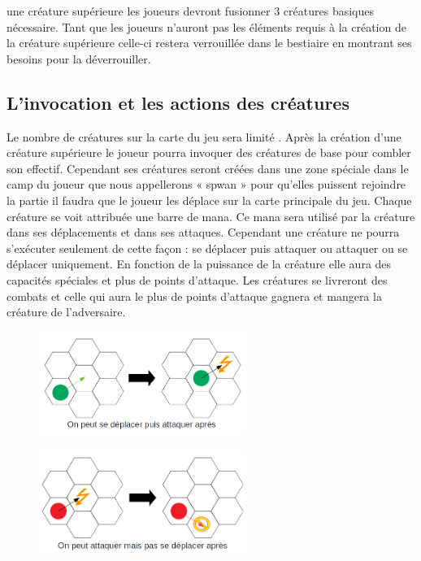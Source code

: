 \documentclass[12pt]{extarticle}
\begin{document}
une créature supérieure les joueurs devront fusionner 3 créatures basiques nécessaire. Tant que les joueurs n’auront pas les éléments requis à la création de la créature supérieure celle-ci restera verrouillée dans le bestiaire en montrant ses besoins pour la déverrouiller. 

\subsection{L'invocation et les actions des créatures}

Le nombre de créatures sur la carte du jeu sera limité . Après la création d’une créature supérieure le joueur pourra invoquer des créatures de base pour combler son effectif. Cependant ses créatures seront créées dans une zone spéciale dans le camp du joueur que nous appellerons « spwan » pour qu’elles puissent rejoindre la partie il faudra que le joueur les déplace sur la carte principale du jeu. Chaque créature se voit attribuée une barre de mana. Ce mana sera utilisé par la créature dans ses déplacements et dans ses attaques. Cependant une créature ne pourra s’exécuter seulement de cette façon : se déplacer puis attaquer ou attaquer ou se déplacer uniquement. En fonction de la puissance de la créature elle aura des capacités spéciales et plus de points d’attaque. Les créatures se livreront des combats et celle qui aura le plus de points d’attaque gagnera et mangera la créature de l’adversaire.

\begin{figure}[!h]
	\center
	\includegraphics[width=0.6\textwidth]{deplaatta}
\end{figure}

\begin{figure}[!h]
	\center
	\includegraphics[width=0.6\textwidth]{attadepla}
\end{figure}
\end{document}
